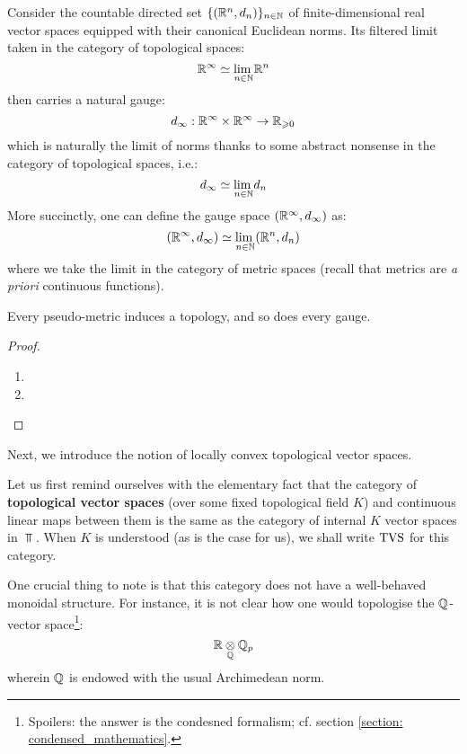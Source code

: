                 \begin{example}
                    Consider the countable directed set $\{(\mathbb{R}^n, d_n)\}_{n \in \mathbb{N}}$ of finite-dimensional real vector spaces equipped with their canonical Euclidean norms. Its filtered limit taken in the category of topological spaces:
                        $$\mathbb{R}^{\infty} \simeq \underset{n \in \mathbb{N}}{\operatorname{lim} \:} \mathbb{R}^n$$
                    then carries a natural gauge:
                        $$d_{\infty}: \R^{\infty} \x \R^{\infty} \to \R_{\geq 0}$$
                    which is naturally the limit of norms thanks to some abstract nonsense in the category of topological spaces, i.e.:
                        $$d_{\infty} \simeq \underset{n \in \mathbb{N}}{\operatorname{lim} \:} d_n$$
                    More succinctly, one can define the gauge space $(\mathbb{R}^{\infty}, d_{\infty})$ as:
                        $$(\mathbb{R}^{\infty}, d_{\infty}) \simeq \underset{n \in \mathbb{N}}{\operatorname{lim} \:} (\mathbb{R}^n, d_n)$$
                    where we take the limit in the category of metric spaces (recall that metrics are \textit{a priori} continuous functions).
                \end{example}
                
                \begin{proposition} \label{prop: topologies_induced_by_pseudo_metrics_and_gauges}
                    Every pseudo-metric induces a topology, and so does every gauge.
                \end{proposition}
                    \begin{proof}
                       \noindent
                       \begin{enumerate}
                           \item 
                           \item 
                       \end{enumerate}
                    \end{proof}
                
                Next, we introduce the notion of locally convex topological vector spaces.
                \begin{remark}
                    Let us first remind ourselves with the elementary fact that the category of \textbf{topological vector spaces} (over some fixed topological field $K$) and continuous linear maps between them is the same as the category of internal $K$ vector spaces in $\Top$. When $K$ is understood (as is the case for us), we shall write $\mathrm{TVS}$ for this category. 
                    
                    One crucial thing to note is that this category does not have a well-behaved monoidal structure. For instance, it is not clear how one would topologise the $\mathbb{Q}$-vector space\footnote{Spoilers: the answer is the condesned formalism; cf. section \ref{section: condensed_mathematics}.}:
                        $$\R \tensor_{\Q} \Q_p$$
                    wherein $\mathbb{Q}$ is endowed with the usual Archimedean norm. 
                \end{remark}
                
